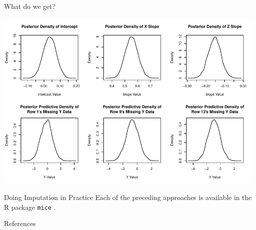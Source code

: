 \documentclass[table]{beamer}
\begin{document}
\begin{frame}{What do we get?}
    

\includegraphics{sweaveFiles/lecture2-014}

\end{frame}


\begin{frame}[shrink = 5]{Doing Imputation in Practice}
  Each of the preceding approaches is available in the \textsf{R}
  package \texttt{mice} \citep{mice}.
    


\end{frame}


\begin{frame}[allowframebreaks]{References}

  
  
 
\end{frame}
\end{document}
